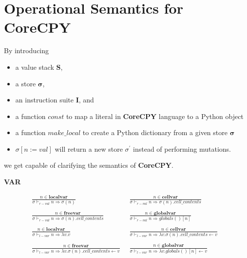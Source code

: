 \documentclass[12pt, a4paper]{report}
\newcommand{\rulegroup}[1]{
    \textbf{#1}
}
\begin{document}
\newpage

\section* {Operational Semantics for \textbf{CoreCPY}}

By introducing 
\begin{itemize}
    \item a value stack $\mathbf{S}$,
    \item a store $\mathbf{\sigma}$,
    \item an instruction suite $\mathbf{I}$, and
    \item a function $const$ to map a literal in \textbf{CoreCPY} language to a Python object
    \item a function $make\_local$ to create a Python dictionary from a given store $\mathbf{\sigma}$
    \item $\sigma[n := val]$ will return a new store $\sigma^{'}$ instead of performing mutations.
\end{itemize}
we get capable of clarifying the semantics of \textbf{CoreCPY}.

\hrulefill

\rulegroup{VAR}

\begin{equation*}
\begin{split}
\frac{n \in \mathbf{localvar}}{\sigma \vdash_{r-val} n \Rightarrow \sigma(n)}
& \;\;
\frac{n \in \mathbf{cellvar}}{\sigma \vdash_{r-val} n \Rightarrow \sigma(n).cell\_contents}
\;\; \\ \\
\frac{n \in \mathbf{freevar}}{\sigma \vdash_{r-val} n \Rightarrow \sigma(n).cell\_contents}
& \;\;
\frac{n \in \mathbf{globalvar}}{\sigma \vdash_{r-val} n \Rightarrow globals()[n]}
\\
\\
\frac{n \in \mathbf{localvar}}{\sigma \vdash_{l-var} n \Rightarrow \lambda v . v}
& \;\;
\frac{n \in \mathbf{cellvar}}{\sigma \vdash_{l-var} n \Rightarrow \lambda v . \sigma(n).cell\_contents \leftarrow v}
\;\; \\ \\
\frac{n \in \mathbf{freevar}}{\sigma \vdash_{l-var} n \Rightarrow \lambda v . \sigma(n).cell\_contents \leftarrow v}
& \;\;
\frac{n \in \mathbf{globalvar}}{\sigma \vdash_{l-var} n \Rightarrow \lambda v. globals()[n] \leftarrow v}
\end{split}
\end{equation*}
\end{document}

